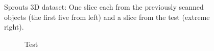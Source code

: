 \documentclass[journal]{IEEEtran}
\begin{document}
\begin{figure}[!h]
\begin{subfigure}[b]{0.29\linewidth}
\captionsetup{labelformat=empty}
        \caption{}
     \end{subfigure}
      \caption{Sprouts 3D dataset: One slice each from the previously scanned objects (the first five from left) and a slice from the test (extreme
        right).}
\label{fig:object-prior_test_sprouts}
\addtolength{\textfloatsep}{-0.8cm}
\end{figure}
\begin{figure}[!h]
    \begin{subfigure}[b]{0.29\linewidth}
        \caption{Test}
     \end{subfigure}
\quad
    \begin{subfigure}[b]{0.3\linewidth}

\end{subfigure}
\end{figure}
\end{document}

